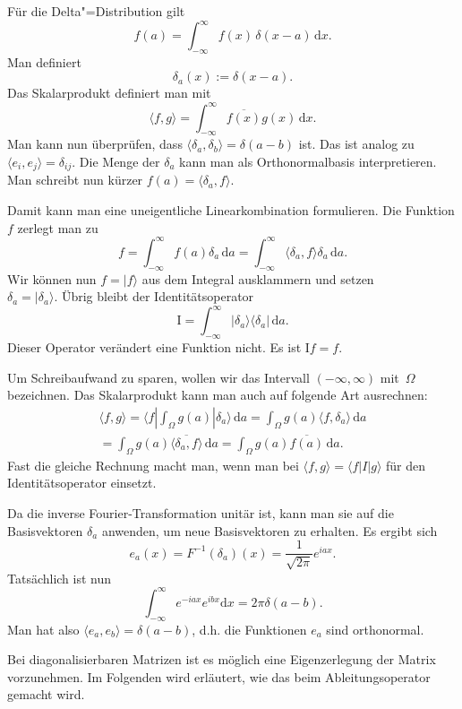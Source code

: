 \documentclass[a4paper,10pt,fleqn,twocolumn,twoside]{article}
\begin{document}
Für die Delta"=Distribution gilt
\[f(a) = \int_{-\infty}^{\infty} f(x)\,\delta(x-a)\,\mathrm dx.\]
Man definiert
\[\delta_a(x) := \delta(x-a).\]
Das Skalarprodukt definiert man mit
\[\langle f,g\rangle
= \int_{-\infty}^{\infty} \overline{f(x)}g(x)\,\mathrm dx.\]
Man kann nun überprüfen, dass
$\langle\delta_a,\delta_b\rangle=\delta(a-b)$ ist. Das ist analog
zu $\langle e_i,e_j\rangle = \delta_{ij}$. Die Menge der
$\delta_a$ kann man als Orthonormalbasis interpretieren.
Man schreibt nun kürzer $f(a) = \langle\delta_a,f\rangle$.

Damit kann man eine uneigentliche Linearkombination formulieren.
Die Funktion $f$ zerlegt man zu
\[f = \int_{-\infty}^{\infty} f(a)\delta_a\,\mathrm da
= \int_{-\infty}^{\infty} \langle\delta_a,f\rangle\delta_a\,\mathrm da.\]
Wir können nun $f=|f\rangle$ aus dem Integral ausklammern und setzen\\
$\delta_a = |\delta_a\rangle$.
Übrig bleibt der Identitätsoperator
\[\mathrm I
= \int_{-\infty}^{\infty} |\delta_a\rangle\langle\delta_a|\,\mathrm da.\]
Dieser Operator verändert eine Funktion nicht. Es ist $\mathrm If=f$.

Um Schreibaufwand zu sparen, wollen wir das Intervall
$(-\infty,\infty)$ mit~$\Omega$ bezeichnen. Das Skalarprodukt
kann man auch auf folgende Art ausrechnen:
\begin{gather*}
\langle f,g\rangle = \langle f|\int_{\Omega} g(a)|\delta_a\rangle\,\mathrm da
= \int_{\Omega} g(a)\langle f,\delta_a\rangle\,\mathrm da\\
= \int_{\Omega} g(a)\overline{\langle\delta_a,f\rangle}\,\mathrm da
= \int_{\Omega} g(a)\overline{f(a)}\,\mathrm da.
\end{gather*}
Fast die gleiche Rechnung macht man, wenn man bei
$\langle f,g\rangle=\langle f|I|g\rangle$ für den
Identitätsoperator einsetzt.

Da die inverse Fourier-Transformation unitär ist, kann man sie auf
die Basisvektoren $\delta_a$ anwenden, um neue Basisvektoren zu
erhalten. Es ergibt sich
\[e_a(x) = F^{-1}(\delta_a)(x) = \frac{1}{\sqrt{2\pi}}e^{iax}.\]
Tatsächlich ist nun
\[\int_{-\infty}^{\infty} e^{-iax}e^{ibx}\mathrm dx = 2\pi\delta(a-b).\]
Man hat also $\langle e_a,e_b\rangle = \delta(a-b)$, d.h. die
Funktionen $e_a$ sind orthonormal.

Bei diagonalisierbaren Matrizen ist es möglich eine Eigenzerlegung
der Matrix vorzunehmen. Im Folgenden wird erläutert, wie das beim
Ableitungsoperator gemacht wird.
\end{document}
